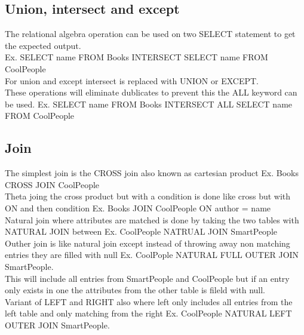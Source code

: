 \documentclass[12pt, a4paper]{article}
\begin{document}
		\subsection{Union, intersect and except}
			The relational algebra operation can be used on two SELECT statement to get the expected output.\\
			Ex. SELECT name FROM Books INTERSECT SELECT name FROM CoolPeople\\
			For union and except intersect is replaced with UNION or EXCEPT.\\
			These operations will eliminate dublicates to prevent this the ALL keyword can be used. Ex. SELECT name FROM Books INTERSECT ALL SELECT name FROM CoolPeople\\
		\subsection{Join}
			The simplest join is the CROSS join also known as cartesian product Ex. Books CROSS JOIN CoolPeople\\
			Theta joing the cross product but with a condition is done like cross but with ON and then condition Ex. Books JOIN CoolPeople ON author = name\\
			Natural join where attributes are matched is done by taking the two tables with NATURAL JOIN between Ex. CoolPeople NATRUAL JOIN SmartPeople\\
			Outher join is like natural join except instead of throwing away non matching entries they are filled with null Ex. CoolPople NATURAL FULL OUTER JOIN SmartPeople. \\
			This will include all entries from SmartPeople and CoolPeople but if an entry only exists in one the attributes from the other table is fileld with null.\\
			Variant of LEFT and RIGHT also where left only includes all entries from the left table and only matching from the right Ex. CoolPeople NATURAL LEFT OUTER JOIN SmartPeople.\\
\end{document}
